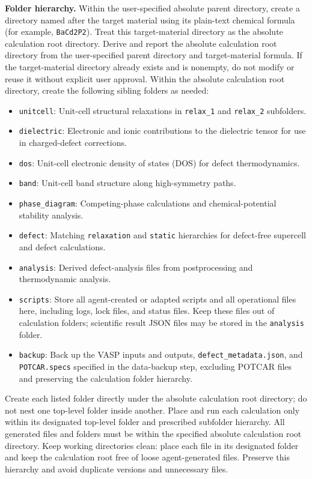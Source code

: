 \documentclass[aip,jap,reprint,amsmath,amssymb]{revtex4-2}
\begin{document}
\textbf{Folder hierarchy.} Within the user-specified absolute parent directory, create a directory named after the target material using its plain-text chemical formula (for example, \texttt{BaCd2P2}). Treat this target-material directory as the absolute calculation root directory. Derive and report the absolute calculation root directory from the user-specified parent directory and target-material formula. If the target-material directory already exists and is nonempty, do not modify or reuse it without explicit user approval. Within the absolute calculation root directory, create the following sibling folders as needed:
\begin{itemize}
    \item \texttt{unitcell}: Unit-cell structural relaxations in \texttt{relax\_1} and \texttt{relax\_2} subfolders.
    \item \texttt{dielectric}: Electronic and ionic contributions to the dielectric tensor for use in charged-defect corrections.
    \item \texttt{dos}: Unit-cell electronic density of states (DOS) for defect thermodynamics.
    \item \texttt{band}: Unit-cell band structure along high-symmetry paths.
    \item \texttt{phase\_diagram}: Competing-phase calculations and chemical-potential stability analysis.
    \item \texttt{defect}: Matching \texttt{relaxation} and \texttt{static} hierarchies for defect-free supercell and defect calculations.
    \item \texttt{analysis}: Derived defect-analysis files from postprocessing and thermodynamic analysis.
    \item \texttt{scripts}: Store all agent-created or adapted scripts and all operational files here, including logs, lock files, and status files. Keep these files out of calculation folders; scientific result JSON files may be stored in the \texttt{analysis} folder.
    \item \texttt{backup}: Back up the VASP inputs and outputs, \texttt{defect\_metadata.json}, and \texttt{POTCAR.specs} specified in the data-backup step, excluding POTCAR files and preserving the calculation folder hierarchy.
\end{itemize}
Create each listed folder directly under the absolute calculation root directory; do not nest one top-level folder inside another. Place and run each calculation only within its designated top-level folder and prescribed subfolder hierarchy.
All generated files and folders must be within the specified absolute calculation root directory.
Keep working directories clean: place each file in its designated folder and keep the calculation root free of loose agent-generated files. Preserve this hierarchy and avoid duplicate versions and unnecessary files.
\end{document}
